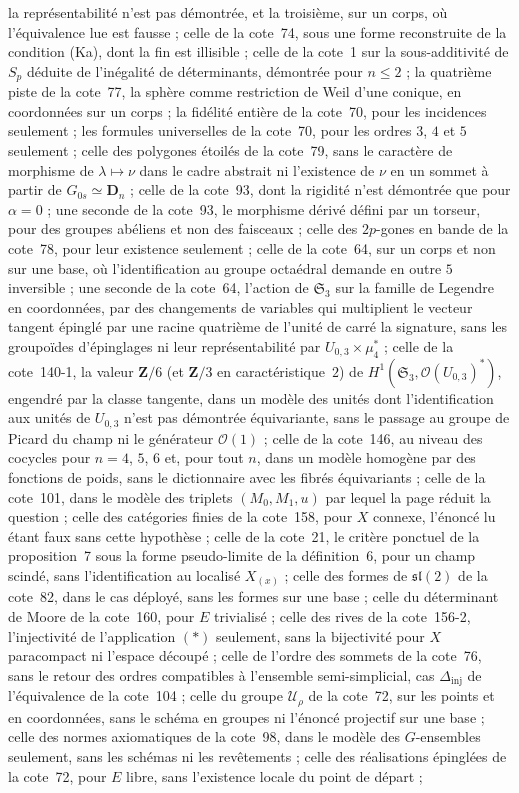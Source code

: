 \documentclass[11pt]{article}
\theoremstyle{plain}
\theoremstyle{definition}
\theoremstyle{plain}
\theoremstyle{definition}
\theoremstyle{remark}
\renewcommand{\_}{\bkunderscore\allowbreak}
\begin{document}
la représentabilité n'est pas démontrée, et la troisième, sur un corps, où l'équivalence lue est fausse ; celle de la cote~74, sous une forme reconstruite de la condition (Ka), dont la fin est illisible ; celle de la cote~1 sur la sous-additivité de $S_p$ déduite de l'inégalité de déterminants, démontrée pour $n \leq 2$ ; la quatrième piste de la cote~77, la sphère comme restriction de Weil d'une conique, en coordonnées sur un corps ; la fidélité entière de la cote~70, pour les incidences seulement ; les formules universelles de la cote~70, pour les ordres $3$, $4$ et $5$ seulement ; celle des polygones étoilés de la cote~79, sans le caractère de morphisme de $\lambda \mapsto \nu$ dans le cadre abstrait ni l'existence de $\nu$ en un sommet à partir de $G_{0s} \simeq \mathbf D_n$ ; celle de la cote~93, dont la rigidité n'est démontrée que pour $\alpha = 0$ ; une seconde de la cote~93, le morphisme dérivé défini par un torseur, pour des groupes abéliens et non des faisceaux ; celle des $2p$-gones en bande de la cote~78, pour leur existence seulement ; celle de la cote~64, sur un corps et non sur une base, où l'identification au groupe octaédral demande en outre $5$ inversible ; une seconde de la cote~64, l'action de $\mathfrak S_3$ sur la famille de Legendre en coordonnées, par des changements de variables qui multiplient le vecteur tangent épinglé par une racine quatrième de l'unité de carré la signature, sans les groupoïdes d'épinglages ni leur représentabilité par $U_{0,3} \times \mu_4^*$ ; celle de la cote~140-1, la valeur $\mathbf Z/6$ (et $\mathbf Z/3$ en caractéristique~$2$) de $H^1(\mathfrak S_3, \mathcal O(U_{0,3})^*)$, engendré par la classe tangente, dans un modèle des unités dont l'identification aux unités de $U_{0,3}$ n'est pas démontrée équivariante, sans le passage au groupe de Picard du champ ni le générateur $\mathcal O(1)$ ; celle de la cote~146, au niveau des cocycles pour $n = 4$, $5$, $6$ et, pour tout $n$, dans un modèle homogène par des fonctions de poids, sans le dictionnaire avec les fibrés équivariants ; celle de la cote~101, dans le modèle des triplets $(M_0, M_1, u)$ par lequel la page réduit la question ; celle des catégories finies de la cote~158, pour $X$ connexe, l'énoncé lu étant faux sans cette hypothèse ; celle de la cote~21, le critère ponctuel de la proposition~7 sous la forme pseudo-limite de la définition~6, pour un champ scindé, sans l'identification au localisé $X_{(x)}$ ; celle des formes de $\mathfrak{sl}(2)$ de la cote~82, dans le cas déployé, sans les formes sur une base ; celle du déterminant de Moore de la cote~160, pour $E$ trivialisé ; celle des rives de la cote~156-2, l'injectivité de l'application $(*)$ seulement, sans la bijectivité pour $X$ paracompact ni l'espace découpé ; celle de l'ordre des sommets de la cote~76, sans le retour des ordres compatibles à l'ensemble semi-simplicial, cas $\Delta_{\mathrm{inj}}$ de l'équivalence de la cote~104 ; celle du groupe $\mathcal U_\rho$ de la cote~72, sur les points et en coordonnées, sans le schéma en groupes ni l'énoncé projectif sur une base ; celle des normes axiomatiques de la cote~98, dans le modèle des $G$-ensembles seulement, sans les schémas ni les revêtements ; celle des réalisations épinglées de la cote~72, pour $E$ libre, sans l'existence locale du point de départ ; 
\end{document}
